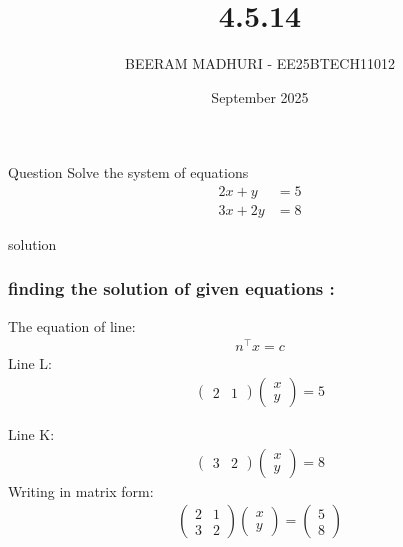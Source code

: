 \documentclass{beamer}
\title %
{4.5.14}
\date{September  2025}
\author %
{BEERAM MADHURI - EE25BTECH11012}
\begin{document}
\frame{\titlepage}
\begin{frame}{Question}
Solve the system of equations\\
\begin{align*}
    2x + y &=5\\
    3x+2y &=8
\end{align*}
\end{frame}
 
\begin{frame}{solution}
    \frametitle{finding the solution of given equations : }
The equation of line:
\begin{align}
n^\top x = c
\end{align}
Line L:
\begin{align}
\begin{pmatrix}2 & 1\end{pmatrix}\begin{pmatrix}x \\y\end{pmatrix}= 5
\end{align}

Line K:
\begin{align}
\begin{pmatrix}3 & 2\end{pmatrix}\begin{pmatrix}x \\y\end{pmatrix}= 8
\end{align}
Writing in matrix form:
\begin{align}
\begin{pmatrix}2 & 1 \\3 & 2\end{pmatrix}\begin{pmatrix}x \\y\end{pmatrix}=\begin{pmatrix}5 \\8\end{pmatrix}
\end{align}
\end{frame}
\end{document}
